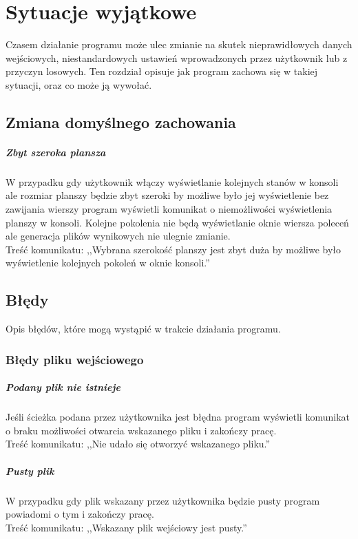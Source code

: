 \documentclass{report}
\begin{document}
\chapter{Sytuacje wyjątkowe}
Czasem działanie programu może ulec zmianie na skutek nieprawidłowych danych wejściowych, niestandardowych ustawień wprowadzonych przez użytkownik lub z przyczyn losowych. Ten rozdział opisuje jak program zachowa się w takiej sytuacji, oraz co może ją wywołać.

\section{Zmiana domyślnego zachowania}
\paragraph{Zbyt szeroka plansza}
W przypadku gdy użytkownik włączy wyświetlanie kolejnych stanów w konsoli ale rozmiar planszy będzie zbyt szeroki by możliwe było jej wyświetlenie bez zawijania wierszy program wyświetli komunikat o niemożliwości wyświetlenia planszy w konsoli. Kolejne pokolenia nie będą wyświetlanie oknie wiersza poleceń ale generacja plików wynikowych nie ulegnie zmianie. \\
Treść komunikatu: ,,Wybrana szerokość planszy jest zbyt duża by możliwe było wyświetlenie kolejnych pokoleń w oknie konsoli.''

\section{Błędy}
Opis błędów, które mogą wystąpić w trakcie działania programu.

\subsection{Błędy pliku wejściowego}

\paragraph{Podany plik nie istnieje}
Jeśli ścieżka podana przez użytkownika jest błędna program wyświetli komunikat o braku możliwości otwarcia wskazanego pliku i zakończy pracę. \\
Treść komunikatu: ,,Nie udało się otworzyć wskazanego pliku.''

\paragraph{Pusty plik}
W przypadku gdy plik wskazany przez użytkownika będzie pusty program powiadomi o tym i zakończy pracę. \\
Treść komunikatu: ,,Wskazany plik wejściowy jest pusty.''
\end{document}
